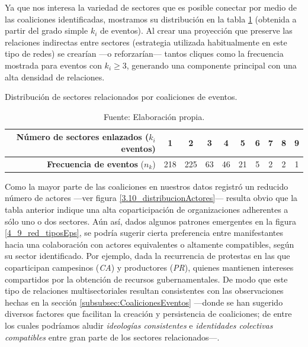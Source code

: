 \documentclass[letterpaper, 11pt]{book}
\theoremstyle{definition}
\theoremstyle{remark}
\begin{document}
Ya que nos interesa la variedad de sectores que es posible conectar por medio de las coaliciones identificadas, mostramos su distribución en la tabla \ref{Sectores_x_EP} (obtenida a partir del grado simple $k_i$ de eventos). 
Al crear una proyección que preserve las relaciones indirectas entre sectores (estrategia utilizada habitualmente en este tipo de redes) se crearían ---o reforzarían--- tantos cliques como la frecuencia mostrada para eventos con $k_{i} \geq 3$, generando una componente principal con una alta densidad de relaciones. 


\begin{table}[!hbt]
\center
\footnotesize
\caption{Distribución de sectores relacionados por coaliciones de eventos.}
\label{Sectores_x_EP}
\begin{tabular}{ | r | c | c | c | c | c | c | c | c | c | } 
\hline
\textbf{Número de sectores enlazados} ($k_{i}$ eventos) & \textbf{1} & \textbf{2} & \textbf{3} & \textbf{4} & \textbf{5} & \textbf{6} & \textbf{7} & \textbf{8} & \textbf{9}\\ \hline
\textbf{Frecuencia de eventos} ($n_{k}$) & 218 & 225 & 63 & 46 & 21 & 5 & 2 & 2 & 1\\ \hline
\end{tabular}
\par\bigskip
\caption*{\small Fuente: Elaboración propia.}
\end{table}



Como la mayor parte de las coaliciones en nuestros datos registró un reducido número de actores ---ver figura \ref{3.10_distribucionActores}--- resulta obvio que la tabla anterior indique una alta coparticipación de organizaciones adherentes a sólo uno o dos sectores. 
Aún así, dados algunos patrones emergentes en la figura \ref{4_9_red_tiposEps}, se podría sugerir cierta preferencia entre manifestantes hacia una colaboración con actores equivalentes o altamente compatibles, según su sector identificado. 
Por ejemplo, dada la recurrencia de protestas en las que coparticipan campesinos (\emph{CA}) y productores (\emph{PR}), quienes mantienen intereses compartidos por la obtención de recursos gubernamentales. 
De modo que este tipo de relaciones multisectoriales resultan consistentes con las observaciones hechas en la sección \ref{subsubsec:CoalicionesEventos} ---donde se han sugerido diversos factores que facilitan la creación y persistencia de coaliciones; de entre los cuales podríamos aludir \emph{ideologías consistentes} e \emph{identidades colectivas compatibles} entre gran parte de los sectores relacionados---. 
\end{document}
